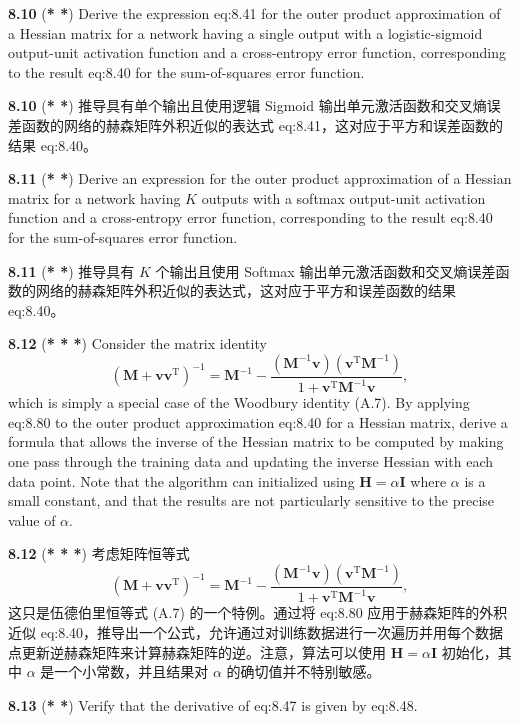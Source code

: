\documentclass{article}
\begin{document}
\textbf{8.10} (\textbf{* *}) Derive the expression {eq:8.41} for the outer product approximation of a Hessian matrix for a network having a single output with a logistic-sigmoid output-unit activation function and a cross-entropy error function, corresponding to the result {eq:8.40} for the sum-of-squares error function.

\textbf{8.10} (\textbf{* *}) 推导具有单个输出且使用逻辑 Sigmoid 输出单元激活函数和交叉熵误差函数的网络的赫森矩阵外积近似的表达式 {eq:8.41}，这对应于平方和误差函数的结果 {eq:8.40}。

\textbf{8.11} (\textbf{* *}) Derive an expression for the outer product approximation of a Hessian matrix for a network having $K$ outputs with a softmax output-unit activation function and a cross-entropy error function, corresponding to the result {eq:8.40} for the sum-of-squares error function.

\textbf{8.11} (\textbf{* *}) 推导具有 $K$ 个输出且使用 Softmax 输出单元激活函数和交叉熵误差函数的网络的赫森矩阵外积近似的表达式，这对应于平方和误差函数的结果 {eq:8.40}。

\textbf{8.12} (\textbf{* * *}) Consider the matrix identity
\[
(\mathbf{M} + \mathbf{v}\mathbf{v}^\mathrm{T})^{-1} = \mathbf{M}^{-1} - \frac{(\mathbf{M}^{-1}\mathbf{v})(\mathbf{v}^\mathrm{T}\mathbf{M}^{-1})}{1 + \mathbf{v}^\mathrm{T}\mathbf{M}^{-1}\mathbf{v}},
\]
which is simply a special case of the Woodbury identity (A.7). By applying {eq:8.80} to the outer product approximation {eq:8.40} for a Hessian matrix, derive a formula that allows the inverse of the Hessian matrix to be computed by making one pass through the training data and updating the inverse Hessian with each data point. Note that the algorithm can initialized using $\mathbf{H} = \alpha \mathbf{I}$ where $\alpha$ is a small constant, and that the results are not particularly sensitive to the precise value of $\alpha$.

\textbf{8.12} (\textbf{* * *}) 考虑矩阵恒等式
\[
(\mathbf{M} + \mathbf{v}\mathbf{v}^\mathrm{T})^{-1} = \mathbf{M}^{-1} - \frac{(\mathbf{M}^{-1}\mathbf{v})(\mathbf{v}^\mathrm{T}\mathbf{M}^{-1})}{1 + \mathbf{v}^\mathrm{T}\mathbf{M}^{-1}\mathbf{v}},
\]
这只是伍德伯里恒等式 (A.7) 的一个特例。通过将 {eq:8.80} 应用于赫森矩阵的外积近似 {eq:8.40}，推导出一个公式，允许通过对训练数据进行一次遍历并用每个数据点更新逆赫森矩阵来计算赫森矩阵的逆。注意，算法可以使用 $\mathbf{H} = \alpha \mathbf{I}$ 初始化，其中 $\alpha$ 是一个小常数，并且结果对 $\alpha$ 的确切值并不特别敏感。

\textbf{8.13} (\textbf{* *}) Verify that the derivative of {eq:8.47} is given by {eq:8.48}.
\end{document}
